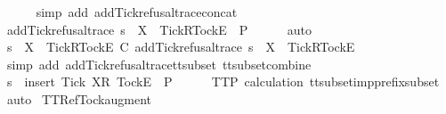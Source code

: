 \begin{isabellebody}
\ \ \ \ \isamarkupfalse%
\ {\isacharparenleft}simp\ add{\isacharcolon}\ add{\isacharunderscore}Tick{\isacharunderscore}refusal{\isacharunderscore}trace{\isacharunderscore}concat{\isacharparenright}\isanewline
\ \ \isamarkupfalse%
\ \isamarkupfalse%
\ {\isachardoublequoteopen}add{\isacharunderscore}Tick{\isacharunderscore}refusal{\isacharunderscore}trace\ s\ {\isacharat}\ {\isacharbrackleft}{\isacharbrackleft}X\ {\isasymunion}\ {\isacharbraceleft}Tick{\isacharbraceright}{\isacharbrackright}\isactrlsub R{\isacharcomma}{\isacharbrackleft}Tock{\isacharbrackright}\isactrlsub E{\isacharbrackright}\ {\isasymin}\ P{\isachardoublequoteclose}\isanewline
\ \ \ \ \isamarkupfalse%
\ auto\isanewline
\ \ \isamarkupfalse%
\ \isamarkupfalse%
\ {\isachardoublequoteopen}s\ {\isacharat}\ {\isacharbrackleft}{\isacharbrackleft}X\ {\isasymunion}\ {\isacharbraceleft}Tick{\isacharbraceright}{\isacharbrackright}\isactrlsub R{\isacharcomma}{\isacharbrackleft}Tock{\isacharbrackright}\isactrlsub E{\isacharbrackright}\ {\isasymsubseteq}\isactrlsub C\ add{\isacharunderscore}Tick{\isacharunderscore}refusal{\isacharunderscore}trace\ s\ {\isacharat}\ {\isacharbrackleft}{\isacharbrackleft}X\ {\isasymunion}\ {\isacharbraceleft}Tick{\isacharbraceright}{\isacharbrackright}\isactrlsub R{\isacharcomma}{\isacharbrackleft}Tock{\isacharbrackright}\isactrlsub E{\isacharbrackright}{\isachardoublequoteclose}\isanewline
\ \ \ \ \isamarkupfalse%
\ {\isacharparenleft}simp\ add{\isacharcolon}\ add{\isacharunderscore}Tick{\isacharunderscore}refusal{\isacharunderscore}trace{\isacharunderscore}tt{\isacharunderscore}subset\ tt{\isacharunderscore}subset{\isacharunderscore}combine{\isacharparenright}\isanewline
\ \ \isamarkupfalse%
\ \isamarkupfalse%
\ {\isachardoublequoteopen}s\ {\isacharat}\ {\isacharbrackleft}{\isacharbrackleft}insert\ Tick\ X{\isacharbrackright}\isactrlsub R{\isacharcomma}\ {\isacharbrackleft}Tock{\isacharbrackright}\isactrlsub E{\isacharbrackright}\ {\isasymin}\ P{\isachardoublequoteclose}\isanewline
\ \ \ \ \isamarkupfalse%
\ TT{}{\isacharunderscore}P\ calculation\ tt{\isacharunderscore}subset{\isacharunderscore}imp{\isacharunderscore}prefix{\isacharunderscore}subset\ \isamarkupfalse%
\ auto\isanewline
{}\isamarkupfalse%
%
\endisatagproof
{\isafoldproof}%
%
\isadelimproof
\isanewline
%
\endisadelimproof
\isanewline
{}\isamarkupfalse%
\ TT{}{\isacharunderscore}Ref{\isacharunderscore}Tock{\isacharunderscore}augment{\isacharcolon}\isanewline

\end{isabellebody}

